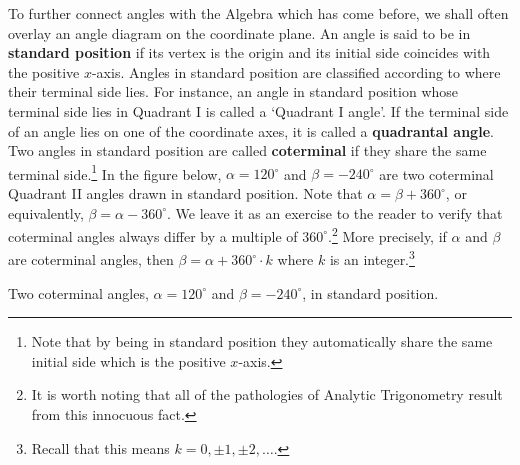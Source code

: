 \documentclass[12pt]{ximera}
\begin{document}
To further connect angles with the Algebra which has come before, we shall often overlay an angle diagram on the coordinate plane.  An angle is said to be in \textbf{standard position} if its vertex is the origin and its initial side coincides with the positive $x$-axis.  Angles in standard position are classified according to where their terminal side lies.  For instance, an angle in standard position whose terminal side lies in Quadrant I is called a `Quadrant I angle'.  If the terminal side of an angle lies on one of the coordinate axes, it is called a \textbf{quadrantal angle}.  Two angles in standard position are called \textbf{coterminal} if they share the same terminal side.\footnote{Note that by being in standard position they automatically share the same initial side which is the positive $x$-axis.}  In the figure below, $\alpha = 120^{\circ}$ and $\beta = -240^{\circ}$ are two coterminal Quadrant II angles drawn in standard position.    Note that $\alpha = \beta + 360^{\circ}$, or equivalently, $\beta = \alpha - 360^{\circ}$. We leave it as an exercise to the reader to verify that coterminal angles always differ by a multiple of $360^{\circ}$.\footnote{It is worth noting that all of the pathologies of Analytic Trigonometry result from this innocuous fact.} More precisely, if $\alpha$ and $\beta$ are coterminal angles, then $\beta = \alpha + 360^{\circ} \cdot k$ where $k$ is an integer.\footnote{Recall that this means $k = 0, \pm 1, \pm 2, \ldots$.}

\begin{center}

\scriptsize
\normalsize


Two coterminal angles, $\alpha = 120^{\circ}$ and $\beta = -240^{\circ}$, in standard position.

\end{center}
\end{document}
